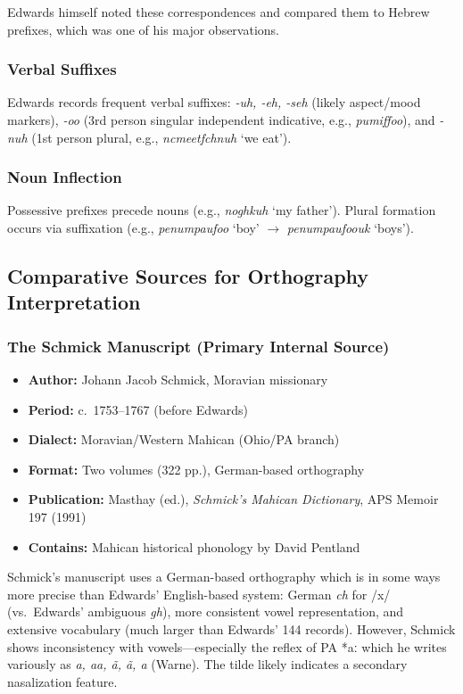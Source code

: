 Edwards himself noted these correspondences and compared them to Hebrew
prefixes, which was one of his major observations.

\subsubsection{Verbal Suffixes}

Edwards records frequent verbal suffixes: \textit{-uh, -eh, -seh} (likely
aspect/mood markers), \textit{-oo} (3rd person singular independent
indicative, e.g., \textit{pumiffoo}), and \textit{-nuh} (1st person plural,
e.g., \textit{ncmeetfchnuh} `we eat').

\subsubsection{Noun Inflection}

Possessive prefixes precede nouns (e.g., \textit{noghkuh} `my father').
Plural formation occurs via suffixation (e.g., \textit{penumpaufoo} `boy'
$\rightarrow$ \textit{penumpaufoouk} `boys').

\subsection{Comparative Sources for Orthography Interpretation}

\subsubsection{The Schmick Manuscript (Primary Internal Source)}

\begin{itemize}
  \item \textbf{Author:} Johann Jacob Schmick, Moravian missionary
  \item \textbf{Period:} c.\ 1753--1767 (before Edwards)
  \item \textbf{Dialect:} Moravian/Western Mahican (Ohio/PA branch)
  \item \textbf{Format:} Two volumes (322 pp.), German-based orthography
  \item \textbf{Publication:} Masthay (ed.), \emph{Schmick's Mahican
    Dictionary}, APS Memoir 197 (1991)
  \item \textbf{Contains:} Mahican historical phonology by David Pentland
\end{itemize}

Schmick's manuscript uses a German-based orthography which is in some ways
more precise than Edwards' English-based system: German \textit{ch} for /x/
(vs.\ Edwards' ambiguous \textit{gh}), more consistent vowel representation,
and extensive vocabulary (much larger than Edwards' 144 records). However,
Schmick shows inconsistency with vowels---especially the reflex of PA *aː
which he writes variously as \textit{a, aa, ã, ã, a} (Warne). The tilde
likely indicates a secondary nasalization feature.

